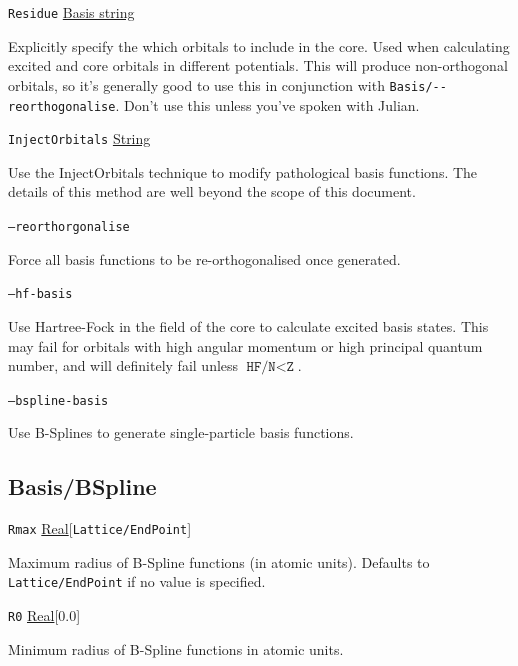 \documentclass{report}
\begin{document}
\texttt{Residue} \uline{Basis string}
\begin{adjustwidth}{1cm}{}
Explicitly specify the which orbitals to include in the core. Used when calculating excited and core
orbitals in different potentials. This will produce non-orthogonal orbitals, so it's generally good to
use this in conjunction with \texttt{Basis/{-}{-}reorthogonalise}. Don't use this unless you've spoken
with Julian.
\end{adjustwidth}

\texttt{InjectOrbitals} \uline{String}
\begin{adjustwidth}{1cm}{}
Use the InjectOrbitals technique to modify pathological basis functions. The details of this method are
well beyond the scope of this document.
\end{adjustwidth}

\texttt{--reorthorgonalise}
\begin{adjustwidth}{1cm}{}
Force all basis functions to be re-orthogonalised once generated.
\end{adjustwidth}

\texttt{--hf-basis}
\begin{adjustwidth}{1cm}{}
Use Hartree-Fock in the field of the core to calculate excited basis states. This may fail for orbitals with high angular momentum or high principal quantum number, and will definitely fail unless $\texttt{HF/N} < \texttt{Z}$.
\end{adjustwidth}

\texttt{--bspline-basis} 
\begin{adjustwidth}{1cm}{}
Use B-Splines to generate single-particle basis functions.
\end{adjustwidth}

\subsection{Basis/BSpline}

\texttt{Rmax} \uline{Real}[\texttt{Lattice/EndPoint}]
\begin{adjustwidth}{1cm}{}
Maximum radius of B-Spline functions (in atomic units). Defaults to \texttt{Lattice/EndPoint} if no 
value is specified.
\end{adjustwidth}

\texttt{R0} \uline{Real}[0.0]
\begin{adjustwidth}{1cm}{}
Minimum radius of B-Spline functions in atomic units. 
\end{adjustwidth}
\end{document}
